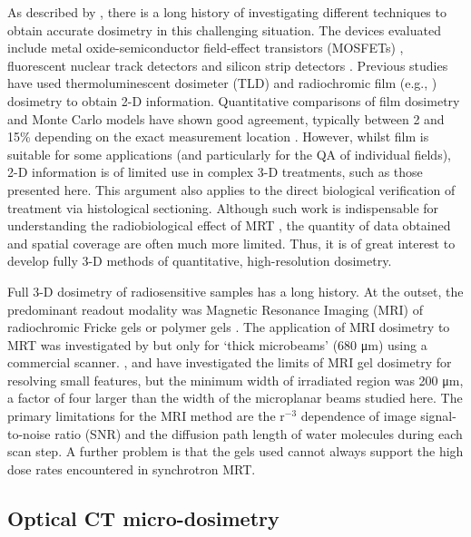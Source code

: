 	As described by \cite{brauer-krischpotential2010}, there is a long history of investigating different techniques to obtain accurate dosimetry in this challenging situation. The devices evaluated include metal oxide-semiconductor field-effect transistors (MOSFETs) \cite{brauer2003mosfet, siegbahnmosfet2009}, fluorescent nuclear track detectors \cite{akselrod2006novel} and silicon strip detectors \cite{lerch2011dosimetry}.
	Previous studies have used thermoluminescent dosimeter (TLD) \cite{ptaszkiewicz2008tld} and radiochromic film (e.g., \cite{crosbie2008method, serduchigh-precision2010}) dosimetry to obtain 2-D information. Quantitative comparisons of film dosimetry and Monte Carlo models have shown good agreement, typically between 2 and 15\% depending on the exact measurement location \cite{martinez-roviradevelopment2012}.  However, whilst film is suitable for some applications (and particularly for the QA of individual fields), 2-D information is of limited use in complex 3-D treatments, such as those presented here. This argument also applies to the direct biological verification of treatment via histological sectioning. Although such work is indispensable for understanding the radiobiological effect of MRT \cite{crosbie2010tumor}, the quantity of data obtained and spatial coverage are often much more limited. Thus, it is of great interest to develop fully 3-D methods of quantitative, high-resolution dosimetry.
	
	Full 3-D dosimetry of radiosensitive samples has a long history. At the outset, the predominant readout modality was Magnetic Resonance Imaging (MRI) of radiochromic Fricke gels \cite{appleby1987imaging, schreiner2004review} or polymer gels \cite{baldock2010polymer,maryanski1993nmr}. The application of MRI dosimetry to MRT was investigated by \cite{dilmanian2008microbeam} but only for `thick microbeams' (680 \si{\um}) using a commercial scanner. \cite{berghigh2004}, \cite{bayrederthe2008} and \cite{heilemann2015pushing} have investigated the limits of MRI gel dosimetry for resolving small features, but the minimum width of irradiated region was 200 \si{\um}, a factor of four larger than the width of the microplanar beams studied here. The primary limitations for the MRI method are the r$^{-3}$ dependence of image signal-to-noise ratio (SNR) and the diffusion path length of water molecules during each scan step. A further problem is that the gels used cannot always support the high dose rates encountered in synchrotron MRT.
	
	\subsection{Optical CT micro-dosimetry}
	
